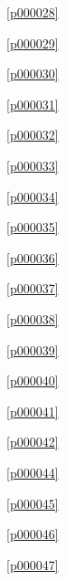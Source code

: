 \noindent\figurename\ \ref{p000028}\dotfill\pageref{p000028}

\noindent\figurename\ \ref{p000029}\dotfill\pageref{p000029}

\noindent\figurename\ \ref{p000030}\dotfill\pageref{p000030}

\noindent\figurename\ \ref{p000031}\dotfill\pageref{p000031}

\noindent\figurename\ \ref{p000032}\dotfill\pageref{p000032}

\noindent\figurename\ \ref{p000033}\dotfill\pageref{p000033}

\noindent\figurename\ \ref{p000034}\dotfill\pageref{p000034}

\noindent\figurename\ \ref{p000035}\dotfill\pageref{p000035}

\noindent\figurename\ \ref{p000036}\dotfill\pageref{p000036}

\noindent\figurename\ \ref{p000037}\dotfill\pageref{p000037}

\noindent\figurename\ \ref{p000038}\dotfill\pageref{p000038}

\noindent\figurename\ \ref{p000039}\dotfill\pageref{p000039}

\noindent\figurename\ \ref{p000040}\dotfill\pageref{p000040}

\noindent\figurename\ \ref{p000041}\dotfill\pageref{p000041}

\noindent\figurename\ \ref{p000042}\dotfill\pageref{p000042}

\noindent\figurename\ \ref{p000044}\dotfill\pageref{p000044}

\noindent\figurename\ \ref{p000045}\dotfill\pageref{p000045}

\noindent\figurename\ \ref{p000046}\dotfill\pageref{p000046}

\noindent\figurename\ \ref{p000047}\dotfill\pageref{p000047}









